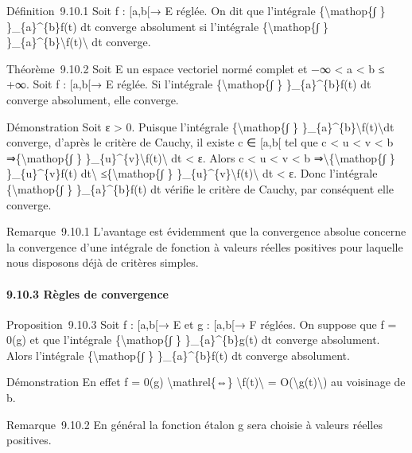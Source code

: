 \documentclass[]{article}
\begin{document}
Définition~9.10.1 Soit f : {[}a,b{[}→ E réglée. On dit que l'intégrale
\{\textbackslash{}mathop\{∫ \} \}\_\{a\}\^{}\{b\}f(t) dt converge
absolument si l'intégrale \{\textbackslash{}mathop\{∫ \}
\}\_\{a\}\^{}\{b\}\textbackslash{}\textbar{}f(t)\textbackslash{}\textbar{}
dt converge.

Théorème~9.10.2 Soit E un espace vectoriel normé complet et −∞
\textless{} a \textless{} b ≤ +∞. Soit f : {[}a,b{[}→ E réglée. Si
l'intégrale \{\textbackslash{}mathop\{∫ \} \}\_\{a\}\^{}\{b\}f(t) dt
converge absolument, elle converge.

Démonstration Soit ε \textgreater{} 0. Puisque l'intégrale
\{\textbackslash{}mathop\{∫ \}
\}\_\{a\}\^{}\{b\}\textbackslash{}\textbar{}f(t)\textbackslash{}\textbar{}dt
converge, d'après le critère de Cauchy, il existe c ∈ {[}a,b{[} tel que
c \textless{} u \textless{} v \textless{} b ⇒\{\textbackslash{}mathop\{∫
\}
\}\_\{u\}\^{}\{v\}\textbackslash{}\textbar{}f(t)\textbackslash{}\textbar{}
dt \textless{} ε. Alors c \textless{} u \textless{} v \textless{} b
⇒\textbackslash{}\textbar{}\{\textbackslash{}mathop\{∫ \}
\}\_\{u\}\^{}\{v\}f(t) dt\textbackslash{}\textbar{}
≤\{\textbackslash{}mathop\{∫ \}
\}\_\{u\}\^{}\{v\}\textbackslash{}\textbar{}f(t)\textbackslash{}\textbar{}
dt \textless{} ε. Donc l'intégrale \{\textbackslash{}mathop\{∫ \}
\}\_\{a\}\^{}\{b\}f(t) dt vérifie le critère de Cauchy, par conséquent
elle converge.

Remarque~9.10.1 L'avantage est évidemment que la convergence absolue
concerne la convergence d'une intégrale de fonction à valeurs réelles
positives pour laquelle nous disposons déjà de critères simples.

\paragraph{9.10.3 Règles de convergence}

Proposition~9.10.3 Soit f : {[}a,b{[}→ E et g : {[}a,b{[}→ F réglées. On
suppose que f = 0(g) et que l'intégrale \{\textbackslash{}mathop\{∫ \}
\}\_\{a\}\^{}\{b\}g(t) dt converge absolument. Alors l'intégrale
\{\textbackslash{}mathop\{∫ \} \}\_\{a\}\^{}\{b\}f(t) dt converge
absolument.

Démonstration En effet f = 0(g) \textbackslash{}mathrel\{⇔\}
\textbackslash{}\textbar{}f(t)\textbackslash{}\textbar{} =
O(\textbackslash{}\textbar{}g(t)\textbackslash{}\textbar{}) au voisinage
de b.

Remarque~9.10.2 En général la fonction étalon g sera choisie à valeurs
réelles positives.
\end{document}

